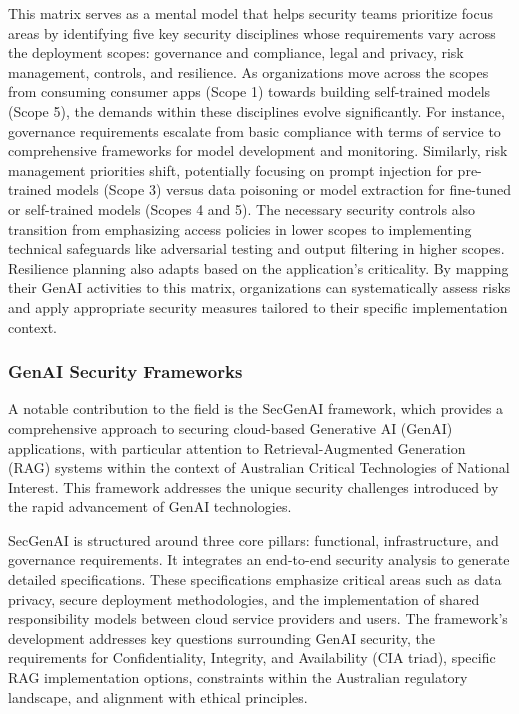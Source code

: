 This matrix serves as a mental model\cite{noauthor_securing_nodate} that helps security teams prioritize focus areas by identifying five key security disciplines whose requirements vary across the deployment scopes: governance and compliance, legal and privacy, risk management, controls, and resilience\cite{noauthor_securing_2023}\cite{noauthor_securing_nodate}. As organizations move across the scopes from consuming consumer apps (Scope 1) towards building self-trained models (Scope 5), the demands within these disciplines evolve significantly. For instance, governance requirements escalate from basic compliance with terms of service to comprehensive frameworks for model development and monitoring. Similarly, risk management priorities shift, potentially focusing on prompt injection for pre-trained models (Scope 3) versus data poisoning or model extraction for fine-tuned or self-trained models (Scopes 4 and 5). The necessary security controls also transition from emphasizing access policies in lower scopes to implementing technical safeguards like adversarial testing and output filtering in higher scopes. Resilience planning also adapts based on the application's criticality. By mapping their GenAI activities to this matrix, organizations can systematically assess risks and apply appropriate security measures tailored to their specific implementation context.

\subsubsection{GenAI Security Frameworks} %
\label{sec:GenAI Security Frameworks}

A notable contribution to the field is the SecGenAI framework, which provides a comprehensive approach to securing cloud-based Generative AI (GenAI) applications, with particular attention to Retrieval-Augmented Generation (RAG) systems within the context of Australian Critical Technologies of National Interest\cite{haryanto_secgenai_2024}. This framework addresses the unique security challenges introduced by the rapid advancement of GenAI technologies\cite{haryanto_secgenai_2024}.

SecGenAI is structured around three core pillars: functional, infrastructure, and governance requirements\cite{haryanto_secgenai_2024}. It integrates an end-to-end security analysis to generate detailed specifications. These specifications emphasize critical areas such as data privacy, secure deployment methodologies, and the implementation of shared responsibility models between cloud service providers and users\cite{haryanto_secgenai_2024}. The framework's development addresses key questions surrounding GenAI security, the requirements for Confidentiality, Integrity, and Availability (CIA triad), specific RAG implementation options, constraints within the Australian regulatory landscape, and alignment with ethical principles\cite{haryanto_secgenai_2024}.

